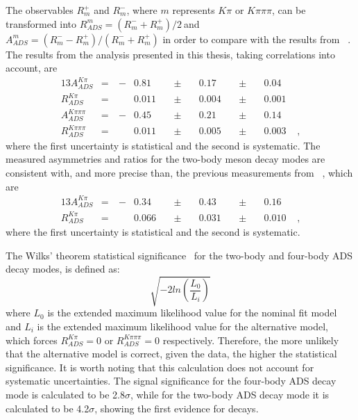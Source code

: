 The \CP observables $R^+_m$ and $R^-_m$, where $m$ represents $K\pi$ or $K\pi\pi\pi$, can be transformed into $R_{ADS}^m = \left(R^-_m + R^+_m\right)/2\ $and \mbox{$A_{ADS}^m = \left(R^-_m - R^+_m\right)/\left(R^-_m + R^+_m\right)$} in order to compare with the results from \babar~\cite{BaBarDKstar}. The results from the analysis presented in this thesis, taking correlations into account, are
\begin{alignat*}{13}
A_{ADS}^{K\pi} &= &\ -&0.81&\ &\pm&\ &0.17&\ &\pm&\ &0.04& \\
R_{ADS}^{K\pi} &= &\ &0.011&\ &\pm&\ &0.004&\ &\pm&\ &0.001& \\
A_{ADS}^{K\pi\pi\pi} &= &\ -&0.45&\ &\pm&\ &0.21&\ &\pm&\ &0.14& \\
R_{ADS}^{K\pi\pi\pi} &= &\ &0.011&\ &\pm&\ &0.005&\ &\pm&\ &0.003& \text{ ,}
\end{alignat*}
where the first uncertainty is statistical and the second is systematic. The measured asymmetries and ratios for the two-body \Dz meson decay modes are consistent with, and more precise than, the previous measurements from \babar~\cite{BaBarDKstar}, which are
\begin{alignat*}{13}
A_{ADS}^{K\pi} &= &\ -&0.34&\ &\pm&\ &0.43&\ &\pm&\ &0.16& \\
R_{ADS}^{K\pi} &= &\ &0.066&\ &\pm&\ &0.031&\ &\pm&\ &0.010& \text{ ,}
\end{alignat*}
where the first uncertainty is statistical and the second is systematic.

The Wilks' theorem statistical significance~\cite{Wilks:1938dza} for the two-body and four-body ADS decay modes, is defined as:
\begin{equation}
\sqrt{-2ln\left(\frac{L_0}{L_i}\right)}
\end{equation}
where $L_0$ is the extended maximum likelihood value for the nominal \CP fit model and $L_i$ is the extended maximum likelihood value for the alternative model, which forces $R_{ADS}^{K\pi} = 0$ or $R_{ADS}^{K\pi\pi\pi} = 0$ respectively. Therefore, the more unlikely that the alternative model is correct, given the data, the higher the statistical significance. It is worth noting that this calculation does not account for systematic uncertainties. The signal significance for the four-body ADS decay mode is calculated to be 2.8$\sigma$, while for the two-body ADS decay mode it is calculated to be 4.2$\sigma$, showing the first evidence for \pik decays.

